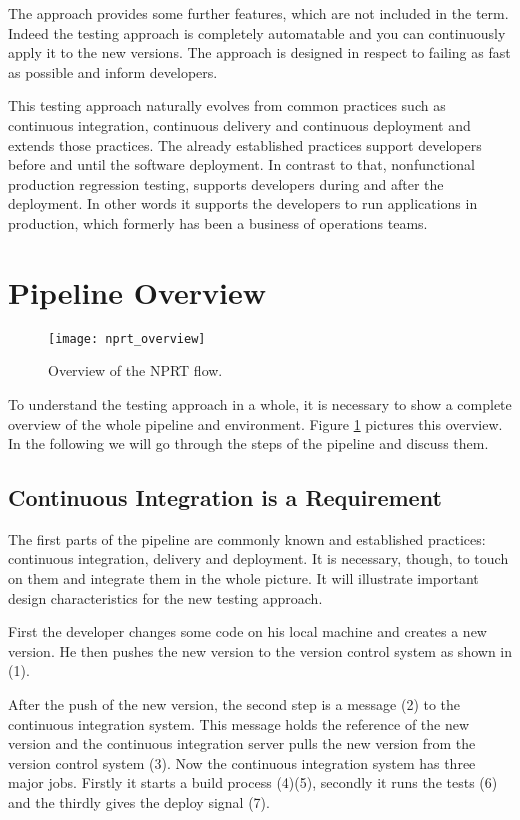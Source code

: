 The approach provides some further features, which are not included in the term. Indeed
the testing approach is completely automatable and you can continuously apply it to the
new versions. The approach is designed in respect to failing as fast as possible and
inform developers.

This testing approach naturally evolves from common practices such as continuous
integration, continuous delivery and continuous deployment and extends those
practices. The already established practices support developers before and until the
software deployment. In contrast to that, nonfunctional production regression testing,
supports developers during and after the deployment. In other words it supports the
developers to run applications in production, which formerly has been a business of
operations teams.

\section{Pipeline Overview}

\begin{figure}[htbp] \centering \texttt{[image: nprt\_overview]}
  \caption[nprtflow]{Overview of the NPRT flow.}
  \label{fig:nprt_flow}
\end{figure}

To understand the testing approach in a whole, it is necessary to show a complete overview
of the whole pipeline and environment. Figure \ref{fig:nprt_flow} pictures this
overview. In the following we will go through the steps of the pipeline and discuss them.

\subsection{Continuous Integration is a Requirement}

The first parts of the pipeline are commonly known and established practices: continuous
integration, delivery and deployment. It is necessary, though, to touch on them and
integrate them in the whole picture. It will illustrate important design characteristics
for the new testing approach.

First the developer changes some code on his local machine and creates a new version. He
then pushes the new version to the version control system as shown in (1).

After the push of the new version, the second step is a message (2) to the continuous
integration system. This message holds the reference of the new version and the continuous
integration server pulls the new version from the version control system (3). Now the
continuous integration system has three major jobs. Firstly it starts a build process
(4)(5), secondly it runs the tests (6) and the thirdly gives the deploy signal (7).

